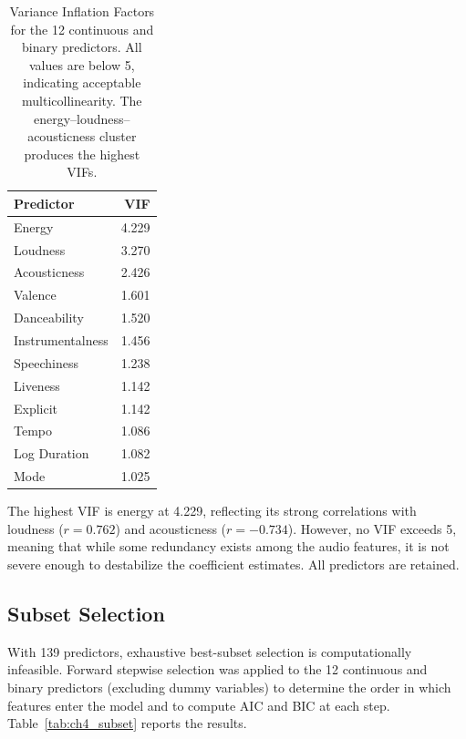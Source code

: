 \documentclass[12pt, oneside]{book}
\begin{document}
\begin{table}[H]
\centering
\caption{Variance Inflation Factors for the 12 continuous and binary predictors. All values are below 5, indicating acceptable multicollinearity. The energy--loudness--acousticness cluster produces the highest VIFs.}
\label{tab:ch4_vif}
\begin{tabular}{lr}
\toprule
\textbf{Predictor} & \textbf{VIF} \\
\midrule
Energy           & 4.229 \\
Loudness         & 3.270 \\
Acousticness     & 2.426 \\
Valence          & 1.601 \\
Danceability     & 1.520 \\
Instrumentalness & 1.456 \\
Speechiness      & 1.238 \\
Liveness         & 1.142 \\
Explicit         & 1.142 \\
Tempo            & 1.086 \\
Log Duration     & 1.082 \\
Mode             & 1.025 \\
\bottomrule
\end{tabular}
\end{table}
 
The highest VIF is energy at 4.229, reflecting its strong correlations with loudness ($r = 0.762$) and acousticness ($r = -0.734$). However, no VIF exceeds 5, meaning that while some redundancy exists among the audio features, it is not severe enough to destabilize the coefficient estimates. All predictors are retained.
 
\subsection{Subset Selection}
 
With 139 predictors, exhaustive best-subset selection is computationally infeasible. Forward stepwise selection was applied to the 12 continuous and binary predictors (excluding dummy variables) to determine the order in which features enter the model and to compute AIC and BIC at each step. Table~\ref{tab:ch4_subset} reports the results.
 
\end{document}
